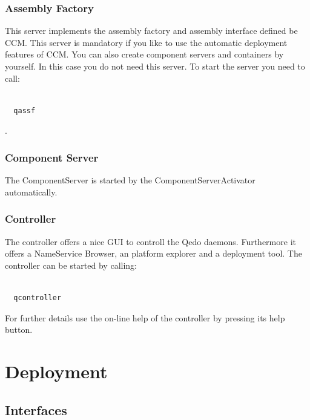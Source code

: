 \documentclass[12pt,a4paper]{report}
\begin{document}
\subsection{Assembly Factory}
\label{sec:AssemblyFactory}

This server implements the assembly factory and assembly interface defined be CCM. This server is mandatory if you like to use the automatic deployment features of CCM. You can also create component servers and containers by yourself. In this case you do not need this server. To start the server you need to call:

\small
\begin{verbatim}

  qassf

\end{verbatim}
\normalsize

.

\subsection{Component Server}
\label{sec:ComponentServer}

The ComponentServer is started by the ComponentServerActivator automatically.

\subsection{Controller}
\label{sec:Controller}

The controller offers a nice GUI to controll the Qedo daemons. Furthermore it offers a NameService Browser, an platform explorer and a deployment tool. The controller can be started by calling:

\small
\begin{verbatim}

  qcontroller

\end{verbatim}
\normalsize

For further details use the on-line help of the controller by pressing its help button.


\chapter{Deployment}
\label{sec:Deployment}

\section{Interfaces}
\label{sec:Interfaces}
\end{document}
